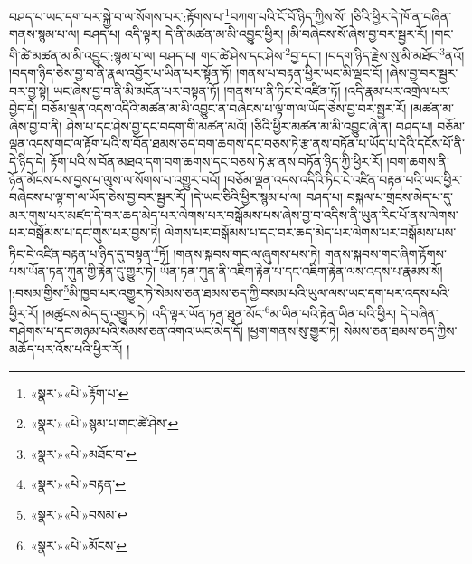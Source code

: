 བཤད་པ་ཡང་དག་པར་སྐྱེ་བ་ལ་སོགས་པར་:རྟོགས་པ་\footnote{«སྣར་»«པེ་»རྟོག་པ་}བཀག་པའི་ངོ་བོ་ཉིད་ཀྱིས་སོ། །ཅིའི་ཕྱིར་དེ་ཁོ་ན་བཞིན་གནས་སྙམ་པ་ལ། བཤད་པ། འདི་ལྟར། དེ་ནི་མཚན་མ་མི་འབྱུང་ཕྱིར། །མི་བཞེངས་སོ་ཞེས་བྱ་བར་སྦྱར་རོ། །གང་གི་ཚེ་མཚན་མ་མི་འབྱུང་:སྙམ་པ་ལ། བཤད་པ། གང་ཚེ་ཤེས་དང་ཤེས་\footnote{«སྣར་»«པེ་»སྙམ་པ་གང་ཚེ་ཤེས་}བྱ་དང་། །བདག་ཉིད་རྗེས་སུ་མི་མཐོང་\footnote{«སྣར་»«པེ་»མཐོང་བ་}ནའོ། །བདག་ཉིད་ཅེས་བྱ་བ་ནི་རྣལ་འབྱོར་པ་ཡིན་པར་སྟོན་ཏོ། །གནས་པ་བརྟན་ཕྱིར་ཡང་མི་ལྡང་ངོ། །ཞེས་བྱ་བར་སྦྱར་བར་བྱ་སྟེ། ཡང་ཞེས་བྱ་བ་ནི་མི་མངོན་པར་བསྟན་ཏོ། །གནས་པ་ནི་ཏིང་ངེ་འཛིན་ཏོ། །འདི་རྣམ་པར་འགྲེལ་པར་བྱེད་དེ། བཅོམ་ལྡན་འདས་འདིའི་མཚན་མ་མི་འབྱུང་ན་བཞེངས་པ་ལྟ་ག་ལ་ཡོད་ཅེས་བྱ་བར་སྦྱར་རོ། །མཚན་མ་ཞེས་བྱ་བ་ནི། ཤེས་པ་དང་ཤེས་བྱ་དང་བདག་གི་མཚན་མའོ། །ཅིའི་ཕྱིར་མཚན་མ་མི་འབྱུང་ཞེ་ན། བཤད་པ། བཅོམ་ལྡན་འདས་གང་ལ་རྟོག་པའི་ས་བོན་ཐམས་ཅད་བག་ཆགས་དང་བཅས་ཏེ་རྩ་ནས་བཏོན་པ་ཡོད་པ་དེའི་དངོས་པོ་ནི་དེ་ཉིད་དེ། རྟོག་པའི་ས་བོན་མཐའ་དག་བག་ཆགས་དང་བཅས་ཏེ་རྩ་ནས་བཏོན་ཉིད་ཀྱི་ཕྱིར་རོ། །བག་ཆགས་ནི་ཉོན་མོངས་པས་བྱས་པ་ལུས་ལ་སོགས་པ་འགྱུར་བའོ། །བཅོམ་ལྡན་འདས་འདིའི་ཏིང་ངེ་འཛིན་བརྟན་པའི་ཡང་ཕྱིར་བཞེངས་པ་ལྟ་ག་ལ་ཡོད་ཅེས་བྱ་བར་སྦྱར་རོ། །དེ་ཡང་ཅིའི་ཕྱིར་སྙམ་པ་ལ། བཤད་པ། བསྐལ་པ་གྲངས་མེད་པ་དུ་མར་གུས་པར་མཛད་དེ་བར་ཆད་མེད་པར་ལེགས་པར་བསྒོམས་པས་ཞེས་བྱ་བ་འདིས་ནི་ཡུན་རིང་པོ་ནས་ལེགས་པར་བསྒོམས་པ་དང་གུས་པར་བྱས་ཏེ། ལེགས་པར་བསྒོམས་པ་དང་བར་ཆད་མེད་པར་ལེགས་པར་བསྒོམས་པས་ཏིང་ངེ་འཛིན་བརྟན་པ་ཉིད་དུ་བསྟན་\footnote{«སྣར་»«པེ་»བརྟན་}ཏོ། །གནས་སྐབས་གང་ལ་ཞུགས་པས་ཏེ། གནས་སྐབས་གང་ཞིག་རྟོགས་པས་ཡོན་ཏན་ཀུན་གྱི་རྟེན་དུ་གྱུར་ཏེ། ཡོན་ཏན་ཀུན་ནི་འཇིག་རྟེན་པ་དང་འཇིག་རྟེན་ལས་འདས་པ་རྣམས་སོ། །:བསམ་གྱིས་\footnote{«སྣར་»«པེ་»བསམ་}མི་ཁྱབ་པར་འགྱུར་ཏེ་སེམས་ཅན་ཐམས་ཅད་ཀྱི་བསམ་པའི་ཡུལ་ལས་ཡང་དག་པར་འདས་པའི་ཕྱིར་རོ། །མཚུངས་མེད་དུ་འགྱུར་ཏེ། འདི་ལྟར་ཡོན་ཏན་ཐུན་མོང་\footnote{«སྣར་»«པེ་»མོངས་}མ་ཡིན་པའི་རྟེན་ཡིན་པའི་ཕྱིར། དེ་བཞིན་གཤེགས་པ་དང་མཉམ་པའི་སེམས་ཅན་འགའ་ཡང་མེད་དོ། །ཕྱག་གནས་སུ་གྱུར་ཏེ། སེམས་ཅན་ཐམས་ཅད་ཀྱིས་མཆོད་པར་འོས་པའི་ཕྱིར་རོ། །
